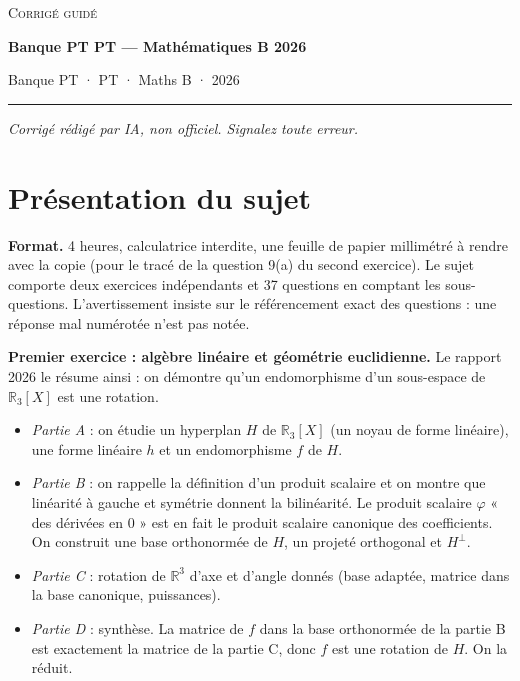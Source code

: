 \documentclass[11pt,a4paper]{article}
\providecommand{\tightlist}{\setlength{\itemsep}{0pt}\setlength{\parskip}{0pt}}
\begin{document}
\thispagestyle{plain}
\begin{center}
  {\small\scshape Corrigé guidé}\par\smallskip
  {\LARGE\bfseries Banque PT PT — Mathématiques B 2026\par}\medskip
  {\large Banque PT · PT · Maths B · 2026\par}
\end{center}
\vspace{2pt}\hrule\vspace{8pt}

\emph{Corrigé rédigé par IA, non officiel. Signalez toute erreur.}

\hypertarget{pruxe9sentation-du-sujet}{%
\section{Présentation du sujet}\label{pruxe9sentation-du-sujet}}

\textbf{Format.} 4 heures, calculatrice interdite, une feuille de papier millimétré à rendre avec la copie (pour le tracé de la question 9(a) du second exercice). Le sujet comporte deux exercices indépendants et 37 questions en comptant les sous-questions. L'avertissement insiste sur le référencement exact des questions : une réponse mal numérotée n'est pas notée.

\textbf{Premier exercice : algèbre linéaire et géométrie euclidienne.} Le rapport 2026 le résume ainsi : on démontre qu'un endomorphisme d'un sous-espace de \({\mathbb{R}}_3[X]\) est une rotation.

\begin{itemize}
\tightlist
\item
  \emph{Partie A} : on étudie un hyperplan \(H\) de \({\mathbb{R}}_3[X]\) (un noyau de forme linéaire), une forme linéaire \(h\) et un endomorphisme \(f\) de \(H\).
\item
  \emph{Partie B} : on rappelle la définition d'un produit scalaire et on montre que linéarité à gauche et symétrie donnent la bilinéarité. Le produit scalaire \(\varphi\) « des dérivées en 0 » est en fait le produit scalaire canonique des coefficients. On construit une base orthonormée de \(H\), un projeté orthogonal et \(H^\perp\).
\item
  \emph{Partie C} : rotation de \({\mathbb{R}}^3\) d'axe et d'angle donnés (base adaptée, matrice dans la base canonique, puissances).
\item
  \emph{Partie D} : synthèse. La matrice de \(f\) dans la base orthonormée de la partie B est exactement la matrice de la partie C, donc \(f\) est une rotation de \(H\). On la réduit.
\end{itemize}
\end{document}

